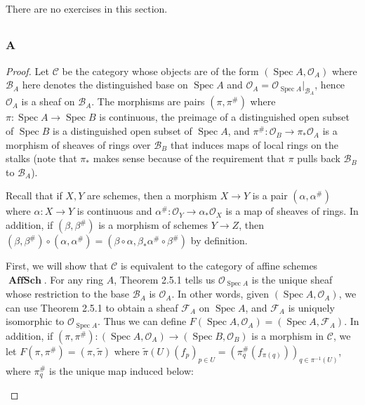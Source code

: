 \documentclass{article}
\newcommand{\calO}{\mathcal{O}}
\newcommand{\fB}{\mathscr{B}}
\newcommand{\fC}{\mathscr{C}}
\newcommand{\fF}{\mathscr{F}}
\newcommand{\fO}{\mathscr{O}}
\DeclareMathOperator{\AffSch}{\mathbf{AffSch}} %
\DeclareMathOperator{\Spec}{\mathrm{Spec}}
\theoremstyle{definition} %
\begin{document}
\subsection{}
There are no exercises in this section.
\subsection{}
\subsubsection{A}\label{4.3.A}
\begin{proof}
    Let $\fC$ be the category whose objects are of the form $(\Spec A, \calO_A)$ where $\fB_A$ here denotes the distinguished base on $\Spec A$ and $\calO_A=\fO_{\Spec A}\vert_{\fB_A}$, hence $\calO_A$ is a sheaf on $\fB_A$. The morphisms are pairs $(\pi, \pi^\#)$ where $\pi:\Spec A \to \Spec B$ is continuous, the preimage of a distinguished open subset of $\Spec B$ is a distinguished open subset of $\Spec A$, and $\pi^\#: \calO_B \to \pi_* \calO_A$ is a morphism of sheaves of rings over $\fB_B$ that induces maps of local rings on the stalks (note that $\pi_*$ makes sense because of the requirement that $\pi$ pulls back $\fB_B$ to $\fB_A$).
    
    Recall that if $X,Y$ are schemes, then a morphism $X\to Y$ is a pair $(\alpha, \alpha^\#)$ where $\alpha:X\to Y$ is continuous and $\alpha^\#:\fO_Y \to \alpha_* \fO_X$ is a map of sheaves of rings. In addition, if $(\beta, \beta^\#)$ is a morphism of schemes $Y\to Z$, then $(\beta, \beta^\#)\circ (\alpha, \alpha^\#)=(\beta \circ \alpha, \beta_* \alpha^\# \circ \beta^\#)$ by definition.

    First, we will show that $\fC$ is equivalent to the category of affine schemes $\AffSch.$ For any ring $A$, Theorem 2.5.1 tells us $\fO_{\Spec A}$ is the unique sheaf whose restriction to the base $\fB_A$ is $\calO_A.$ In other words, given $(\Spec A, \calO_A)$, we can use Theorem 2.5.1 to obtain a sheaf $\fF_A$ on $\Spec A$, and $\fF_A$ is uniquely isomorphic to $\fO_{\Spec A}.$ Thus we can define $F(\Spec A, \calO_A)=(\Spec A, \fF_A)$. In addition, if $(\pi, \pi^{\#}):(\Spec A, \calO_A)\to (\Spec B, \calO_B)$ is a morphism in $\fC$, we let $F(\pi, \pi^\#)=(\pi, \widetilde{\pi})$ where $\widetilde{\pi}(U)(f_p)_{p\in U}=(\pi^\#_q(f_{\pi(q)}))_{q\in \pi^{-1}(U)}$, where $\pi_q^\#$ is the unique map induced below:
    \begin{center}
    \end{center}
    

\end{proof}
\end{document}
